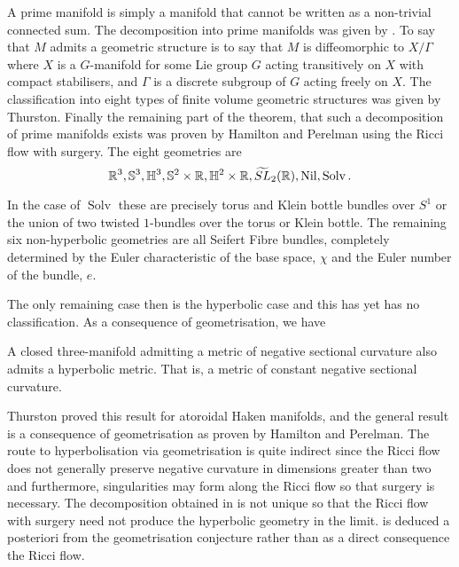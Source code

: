 \documentclass[a4paper,12pt]{amsart}
\begin{document}
A prime manifold is simply a manifold that cannot be written as a non-trivial connected sum. The decomposition into prime manifolds was given by \cite{MR0142125}. To say that \(M\) admits a geometric structure is to say that \(M\) is diffeomorphic to \(X/\Gamma\) where \(X\) is a \(G\)-manifold for some Lie group \(G\) acting transitively on \(X\) with compact stabilisers, and \(\Gamma\) is a discrete subgroup of \(G\) acting freely on \(X\). The classification into eight types of finite volume geometric structures was given by Thurston. Finally the remaining part of the theorem, that such a decomposition of prime manifolds exists was proven by Hamilton and Perelman using the Ricci flow with surgery. The eight geometries are
\[
\mathbb{R}^3, \mathbb{S}^3, \mathbb{H}^3, \mathbb{S}^2 \times \mathbb{R}, \mathbb{H}^2 \times \mathbb{R}, \widetilde{SL}_2(\mathbb{R}), \operatorname{Nil}, \operatorname{Solv}.
\]

In the case of \(\operatorname{Solv}\) these are precisely torus and Klein bottle bundles over \(S^1\) or the union of two twisted \(1\)-bundles over the torus or Klein bottle. The remaining six non-hyperbolic geometries are all Seifert Fibre bundles, completely determined by the Euler characteristic of the base space, \(\chi\) and the Euler number of the bundle, \(e\).

The only remaining case then is the hyperbolic case and this has yet has no classification. As a consequence of geometrisation, we have

\begin{thm}[Hyperbolisation]
\label{thm:hyperbolisation}

A closed three-manifold admitting a metric of negative sectional curvature also admits a hyperbolic metric. That is, a metric of constant negative sectional curvature.
\end{thm}

Thurston proved this result for atoroidal Haken manifolds, and the general result is a consequence of geometrisation as proven by Hamilton and Perelman. The route to hyperbolisation via geometrisation is quite indirect since the Ricci flow does not generally preserve negative curvature in dimensions greater than two and furthermore, singularities may form along the Ricci flow so that surgery is necessary. The decomposition obtained in  is not unique so that the Ricci flow with surgery need not produce the hyperbolic geometry in the limit.  is deduced a posteriori from the geometrisation conjecture rather than as a direct consequence the Ricci flow.
\end{document}
